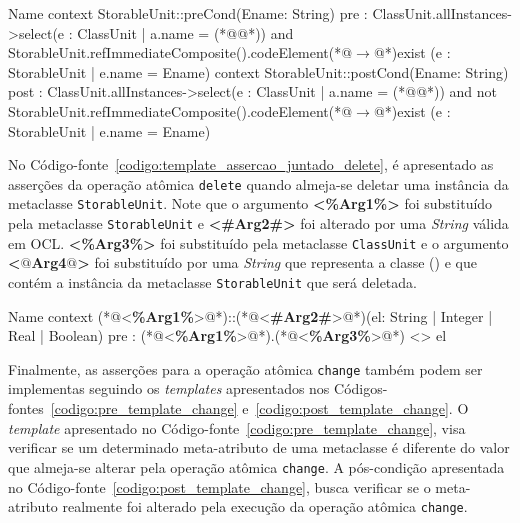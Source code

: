 \begin{codigo}[caption={[Asserções em OCL para realizar a operação atômica \texttt{delete}.] Asserções em OCL para realizar a operação atômica \texttt{delete}.},escapeinside={(*@}{@*)}, basicstyle=\footnotesize, label={codigo:template_assercao_juntado_delete}, language=OCL]{Name}
context StorableUnit::preCond(Ename: String)
pre : ClassUnit.allInstances->select(e : ClassUnit | a.name = (*@@*)) and StorableUnit.refImmediateComposite().codeElement(*@$\rightarrow$@*)exist (e : StorableUnit | e.name = Ename)
context StorableUnit::postCond(Ename: String)
post : ClassUnit.allInstances->select(e : ClassUnit | a.name = (*@@*)) and  not StorableUnit.refImmediateComposite().codeElement(*@$\rightarrow$@*)exist (e : StorableUnit | e.name = Ename)
\end{codigo}

No Código-fonte~\ref{codigo:template_assercao_juntado_delete}, é apresentado as asserções da operação atômica \texttt{delete} quando almeja-se deletar uma instância da metaclasse \texttt{StorableUnit}. Note que o argumento \textbf{<\%Arg1\%>} foi substituído pela metaclasse \texttt{StorableUnit} e \textbf{<\#Arg2\#>} foi alterado por uma \textit{String} válida em OCL. \textbf{<\%Arg3\%>} foi substituído pela metaclasse \texttt{ClassUnit} e o argumento \textbf{<$@$Arg4$@$>} foi  substituído por uma \textit{String} que representa a classe () e que contém a instância da metaclasse \texttt{StorableUnit} que será deletada. 

\begin{codigo}[caption={[\textit{Template} OCL para realizar a pré-condição da operação atômica \texttt{change}.] \textit{Template} OCL para realizar a pré-condição da operação atômica \texttt{change}.},escapeinside={(*@}{@*)}, mathescape=true, basicstyle=\footnotesize, label={codigo:pre_template_change}, language=OCL]{Name}
context (*@<\textbf{\%Arg1\%}>@*)::(*@<\textbf{\#Arg2\#}>@*)(el: String | Integer | Real | Boolean)
pre : (*@<\textbf{\%Arg1\%}>@*).(*@<\textbf{\%Arg3\%}>@*) <> el
\end{codigo}

Finalmente, as asserções para a operação atômica \texttt{change} também podem ser implementas seguindo os \textit{templates} apresentados nos Códigos-fontes~\ref{codigo:pre_template_change} e~\ref{codigo:post_template_change}. O \textit{template} apresentado no Código-fonte~\ref{codigo:pre_template_change}, visa verificar se um determinado meta-atributo de uma metaclasse é diferente do valor que almeja-se alterar pela operação atômica \texttt{change}. A pós-condição apresentada no Código-fonte~\ref{codigo:post_template_change}, busca verificar se o meta-atributo realmente foi alterado pela execução da operação atômica \texttt{change}.

